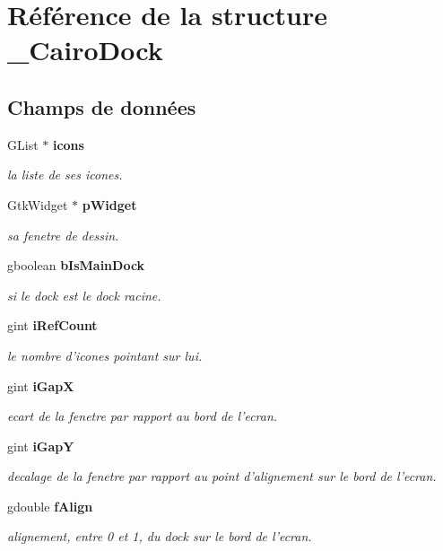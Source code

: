 \section{Référence de la structure \_\-CairoDock}
\label{struct__CairoDock}
\subsection*{Champs de données}
\begin{CompactItemize}
\item 
GList $\ast$ {\bf icons}
\begin{CompactList}\small\item\em la liste de ses icones. \item\end{CompactList}\item 
GtkWidget $\ast$ {\bf pWidget}
\begin{CompactList}\small\item\em sa fenetre de dessin. \item\end{CompactList}\item 
gboolean {\bf bIsMainDock}
\begin{CompactList}\small\item\em si le dock est le dock racine. \item\end{CompactList}\item 
gint {\bf iRefCount}
\begin{CompactList}\small\item\em le nombre d'icones pointant sur lui. \item\end{CompactList}\item 
gint {\bf iGapX}
\begin{CompactList}\small\item\em ecart de la fenetre par rapport au bord de l'ecran. \item\end{CompactList}\item 
gint {\bf iGapY}
\begin{CompactList}\small\item\em decalage de la fenetre par rapport au point d'alignement sur le bord de l'ecran. \item\end{CompactList}\item 
gdouble {\bf fAlign}
\begin{CompactList}\small\item\em alignement, entre 0 et 1, du dock sur le bord de l'ecran. \item\end{CompactList}\item 

\end{CompactItemize}
